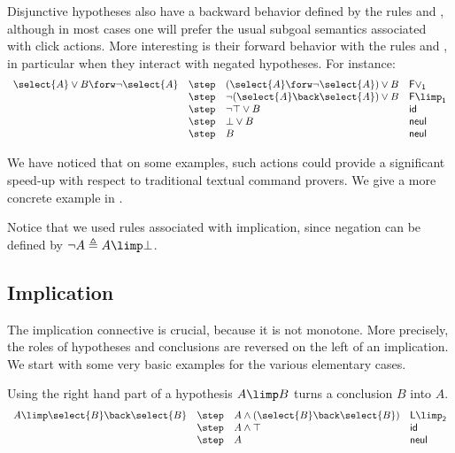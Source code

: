 Disjunctive hypotheses also have a backward behavior defined by the rules
 and , although in most cases one will prefer the
usual subgoal semantics associated with click actions. More interesting is
their forward behavior with the rules  and , in
particular when they interact with negated hypotheses. For instance:
$$
\begin{array}{llll}
  \select{A} \lor B \forw \neg \select{A}
    & \step & (\select{A} \forw \neg\select{A}) \lor B &\mathsf{F\lor_1}\\
    & \step & \neg (\select{A} \back \select{A}) \lor B &\mathsf{F{\limp}_1}\\
    & \step & \neg \top \lor B &\mathsf{id}\\
    & \step & \bot \lor B &\mathsf{neul}\\
    & \step & B &\mathsf{neul}\\
\end{array}
$$

We have noticed that on some examples, such actions could provide a
significant speed-up with respect to traditional textual command
provers. We give a more concrete example in .

Notice that we used rules associated with implication, since negation can be
defined by $\neg A \triangleq A \limp \bot$.

\subsection{Implication}
The implication connective is crucial, because it is not monotone. More
precisely, the roles of hypotheses and conclusions are reversed on the
left of an implication. We start with some very basic examples
for the various elementary cases.

Using the right hand part of a hypothesis $A\limp B$ turns a 
conclusion $B$ into $A$. 
$$
\begin{array}{llll}
  A\limp \select{B} \back \select{B} &\step& A\land (\select{B}
                                                \back
                                                \select{B})&\mathsf{L
                                                             {\limp}_2}\\
                                         &\step&A\land\top & \mathsf{id}\\
    &\step& A&\mathsf{neul}
\end{array}
$$

